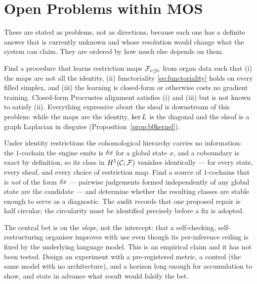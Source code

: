 \chapter{Open Problems within MOS}\label{ch:open}

These are stated as problems, not as directions, because each one has a
definite answer that is currently unknown and whose resolution would
change what the system can claim. They are ordered by how much else
depends on them.

\begin{openproblem}\label{op:restrictions}
Find a procedure that learns restriction maps
$\mathcal{F}_{v\trianglelefteq e}$ from organ data such that
(i) the maps are not all the identity,
(ii) functoriality \eqref{eq:functoriality} holds on every filled
simplex, and
(iii) the learning is closed-form or otherwise costs no gradient
training.
Closed-form Procrustes alignment satisfies (i) and (iii) but is not known
to satisfy (ii). Everything expressive about the sheaf is downstream of
this problem: while the maps are the identity, $\ker L$ is the
diagonal and the sheaf is a graph Laplacian in disguise
(Proposition~\ref{prop:b0kernel}).
\end{openproblem}

\begin{openproblem}\label{op:H1}
Under identity restrictions the cohomological hierarchy carries no
information: the $1$-cochain the engine emits is $\delta x$ for a global
state $x$, and a coboundary is exact by definition, so its class in
$H^{1}(\mathcal{C};\mathcal{F})$ vanishes identically --- for every state, every sheaf, and every
choice of restriction map. Find a source of $1$-cochains that is
\emph{not} of the form $\delta x$ --- pairwise judgements formed
independently of any global state are the candidate --- and determine
whether the resulting classes are stable enough to serve as a diagnostic.
The audit records that one proposed repair is half circular; the
circularity must be identified precisely before a fix is adopted.
\end{openproblem}

\begin{openproblem}\label{op:slope}
The central bet is on the \emph{slope}, not the intercept: that a
self-checking, self-restructuring organiser improves with use even though
its per-inference ceiling is fixed by the underlying language model.
This is an empirical claim and it has not been tested. Design an
experiment with a pre-registered metric, a control (the same model with
no architecture), and a horizon long enough for accumulation to show, and
state in advance what result would falsify the bet.
\end{openproblem}

